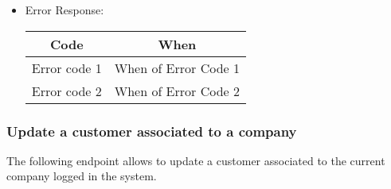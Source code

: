 \begin{itemize}
    \item Error Response:
    \begin{table}[!h]
    \centering 
    \begin{tabular}{|c|c|}
    \hline
    \multicolumn{1}{|c|}{\textbf{Code}} & \multicolumn{1}{c|}{\textbf{When}} \\ \hline
    Error code 1 & When of Error Code 1 \\\hline
    Error code 2 & When of Error Code 2 \\\hline
    \end{tabular} 
    \end{table} 
    
\end{itemize}


\subsubsection*{Update a customer associated to a company}

The following endpoint allows to update a customer associated to the current company logged in the system.

